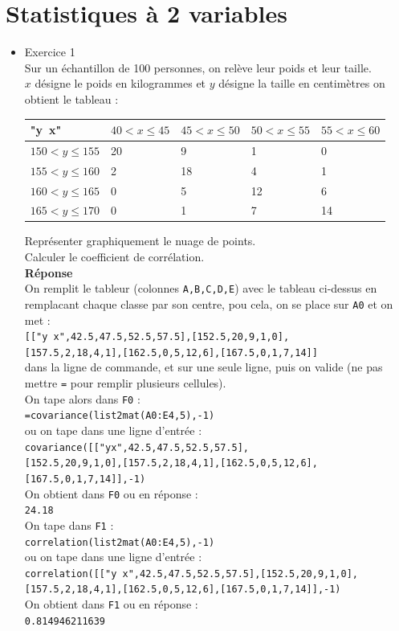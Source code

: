 \documentclass[a4paper,11pt]{book}
\begin{document}
\section{Statistiques \`a 2 variables}
\begin{itemize}
\item Exercice 1\\
Sur un \'echantillon de 100 personnes, on rel\`eve leur poids et leur taille.\\
$x$ d\'esigne le poids en kilogrammes et $y$ d\'esigne la taille en 
centim\`etres on obtient le tableau :\\
\begin{center}{\tt \begin{tabular}{|l|l|l|l|l|}
\hline
"y\ x" &$40<x \leq 45$&$45<x \leq 50$&$50<x \leq 55$&$55<x \leq 60$\\
\hline
$150<y \leq 155$ & 20 &9 &1&0\\
\hline
$155<y \leq 160$ &2&18&4&1\\
\hline
$160<y \leq 165$& 0&5&12&6\\
\hline
$165<y \leq 170$ & 0 & 1&7&14\\
\hline
\end{tabular}}\end{center}
Repr\'esenter graphiquement le nuage de points.\\
Calculer le coefficient de corr\'elation.\\

{\bf R\'eponse}\\
On remplit le tableur (colonnes {\tt A,B,C,D,E}) avec le tableau ci-dessus en 
remplacant chaque classe par son centre, pou cela, on se place sur {\tt A0} et 
on met :\\
{\tt [["y\ x",42.5,47.5,52.5,57.5],[152.5,20,9,1,0],}\\
{\tt [157.5,2,18,4,1],[162.5,0,5,12,6],[167.5,0,1,7,14]]}\\
dans la ligne de commande, et sur une seule ligne, puis on valide 
(ne pas mettre {\tt =} pour remplir plusieurs cellules).\\
On tape alors dans {\tt F0} :\\
{\tt =covariance(list2mat(A0:E4,5),-1)}\\
ou on tape dans une ligne d'entr\'ee :\\
{\tt covariance([["yx",42.5,47.5,52.5,57.5],}\\
{\tt [152.5,20,9,1,0],[157.5,2,18,4,1],[162.5,0,5,12,6],}\\
{\tt [167.5,0,1,7,14]],-1)}\\
On obtient dans {\tt F0} ou en r\'eponse :\\
{\tt 24.18}\\
On tape dans {\tt F1} :\\
{\tt correlation(list2mat(A0:E4,5),-1)}\\
ou on tape dans une ligne d'entr\'ee :\\
{\tt correlation([["y\ x",42.5,47.5,52.5,57.5],[152.5,20,9,1,0],}\\
{\tt [157.5,2,18,4,1],[162.5,0,5,12,6],[167.5,0,1,7,14]],-1)}\\
On obtient dans {\tt F1} ou en r\'eponse :\\
{\tt 0.814946211639}


\end{itemize}
\end{document}
